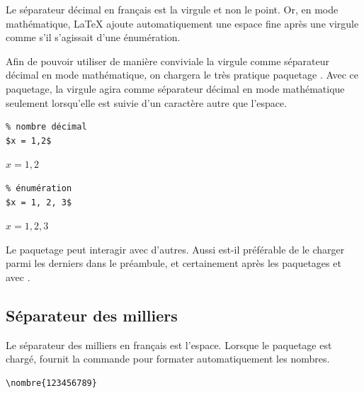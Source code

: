 {Le séparateur décimal en français est la virgule et non le point. Or,
en mode mathématique, LaTeX ajoute automatiquement une espace fine
après une virgule comme s'il s'agissait d'une énumération.

Afin de pouvoir utiliser de manière conviviale la virgule comme
séparateur décimal en mode mathématique, on chargera le très pratique
paquetage  \citep{icomma}. Avec ce paquetage, la virgule
agira comme séparateur décimal en mode mathématique seulement
lorsqu'elle est suivie d'un caractère autre que l'espace.
\begin{demo}
  \begin{minipage}{0.5\linewidth}
    \begin{texample}[0.6\linewidth]
\begin{lstlisting}
% nombre décimal
$x = 1,2$
\end{lstlisting}
      \producing
      $x = 1,2$
    \end{texample}
  \end{minipage}
  \hfill
  \begin{minipage}{0.5\linewidth}
    \begin{texample}[0.6\linewidth]
\begin{lstlisting}
% énumération
$x = 1, 2, 3$
\end{lstlisting}
      \producing
      $x = 1, 2, 3$
    \end{texample}
  \end{minipage}
\end{demo}

\begin{important}
  Le paquetage  peut interagir avec d'autres. Aussi
  est-il préférable de le charger parmi les derniers dans le préambule, et
  certainement après les paquetages  et
   avec {\XeLaTeX}.
\end{important}

\subsection{Séparateur des milliers}
\label{sec:bases:francais:milliers}

Le séparateur des milliers en français est l'espace. Lorsque le
paquetage  \citep{numprint} est chargé, 
fournit la commande \cmd{\nombre} pour formater automatiquement les
nombres.
\begin{demo}
  \begin{texample}
\begin{lstlisting}
\nombre{123456789}
\end{lstlisting}
    \producing
  \end{texample}
\end{demo}

}
